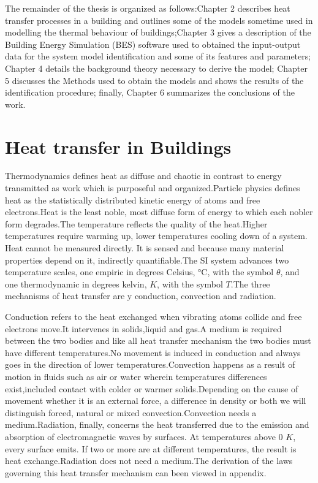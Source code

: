 \documentclass[a4paper,12pt]{report}
\numberwithin{equation}{section}
\begin{document}
The remainder of the thesis is organized as follows:Chapter 2 describes heat transfer processes in a building and outlines some of the models sometime used in modelling the thermal behaviour of buildings;Chapter 3 gives a description of the Building Energy Simulation (BES) software used to obtained the input-output data for the system model identification and some of its features and parameters; Chapter 4 details the background  theory necessary to derive the model; Chapter 5 discusses  the Methods used to obtain the models and shows the results of the identification procedure; finally, Chapter 6 summarizes the conclusions of the work. 



\newpage
\chapter{Heat transfer in Buildings}
Thermodynamics defines heat as diffuse and chaotic in contrast to energy transmitted as work which is purposeful and organized.Particle physics defines heat as the statistically distributed kinetic energy of atoms and free electrons.Heat is the least noble, most diffuse form of energy to which each nobler form degrades.The temperature reflects the quality of the heat.Higher temperatures require warming up, lower temperatures cooling down of a system. Heat cannot be
measured directly. It is sensed and because many material properties depend on it, indirectly quantifiable.The SI system advances two temperature scales, one empiric in degrees Celsius, °C,
with the symbol $\theta$, and one thermodynamic in degrees kelvin, $K$, with the symbol $T$.The three mechanisms of heat transfer are y conduction, convection and radiation.

Conduction refers to the heat exchanged when vibrating atoms collide and free electrons move.It intervenes in solids,liquid and gas.A medium is required between the two bodies and like all heat transfer mechanism the two bodies must have different temperatures.No movement is induced in conduction and always goes in the direction of lower temperatures.Convection happens as a result of motion in  fluids such as air or water wherein temperatures differences exist,included contact with colder or warmer solids.Depending on the cause of movement whether it is an external force, a difference in density or both we will distinguish forced, natural or mixed convection.Convection needs a medium.Radiation, finally, concerns the heat transferred due to the emission and absorption of electromagnetic waves by surfaces. At temperatures above 0 $K$, every surface emits. If two or more are at different temperatures, the result is heat exchange.Radiation does not need a medium.The derivation of the laws governing this heat transfer mechanism can been viewed in appendix.
\end{document}
